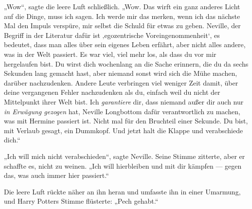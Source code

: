 „Wow“, sagte die leere Luft schließlich.
„Wow. Das wirft ein ganz anderes Licht auf die Dinge, muss ich sagen. Ich werde mir das merken, wenn ich das nächste Mal den Impuls verspüre, mir selbst die Schuld für etwas zu geben. Neville, der Begriff in der Literatur dafür ist ‚egozentrische Voreingenommenheit‘, es bedeutet, dass man alles über sein eigenes Leben erfährt, aber nicht alles andere, was in der Welt passiert. Es war viel, viel mehr los, als dass du vor mir hergelaufen bist. Du wirst dich wochenlang an die Sache erinnern, die du da sechs Sekunden lang gemacht hast, aber niemand sonst wird sich die Mühe machen, darüber nachzudenken. Andere Leute verbringen viel weniger Zeit damit, über deine vergangenen Fehler nachzudenken als du, einfach weil du nicht der Mittelpunkt ihrer Welt bist. Ich \emph{garantiere} dir, dass niemand außer dir auch nur \emph{in Erwägung gezogen} hat, Neville Longbottom dafür verantwortlich zu machen, was mit Hermine passiert ist. Nicht mal für den Bruchteil einer Sekunde. Du bist, mit Verlaub gesagt, ein Dummkopf. Und jetzt halt die Klappe und verabschiede dich.“

„Ich will mich nicht verabschieden“, sagte Neville. Seine Stimme zitterte, aber er schaffte es, nicht zu weinen.
„Ich will hierbleiben und mit dir kämpfen — gegen das, was auch immer hier passiert.“

Die leere Luft rückte näher an ihn heran und umfasste ihn in einer Umarmung, und Harry Potters Stimme flüsterte:
„Pech gehabt.“

